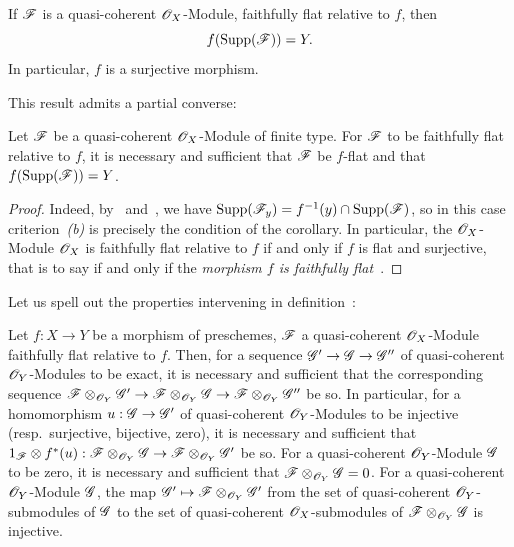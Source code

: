 \begin{corollary}[2.2.5]
\label{IV.2.2.5}
If $\mathscr{F}$ is a quasi-coherent $\mathscr{O}_X$-Module, faithfully flat relative to $f$, then
\[
  f(\operatorname{Supp}(\mathscr{F}))=Y.
\]
In particular, $f$ is a surjective morphism.
\end{corollary}

This result admits a partial converse:

\begin{corollary}[2.2.6]
\label{IV.2.2.6}
Let $\mathscr{F}$ be a quasi-coherent $\mathscr{O}_X$-Module of finite type. For $\mathscr{F}$ to be faithfully flat relative to $f$, it is necessary and sufficient that $\mathscr{F}$ be $f$-flat and that $f(\operatorname{Supp}(\mathscr{F}))=Y$.
\end{corollary}

\begin{proof}
Indeed, by~ and~, we have $\operatorname{Supp}(\mathscr{F}_y)=f^{-1}(y)\cap\operatorname{Supp}(\mathscr{F})$, so in this case criterion~\emph{(b)} is precisely the condition of the corollary.
In particular, the $\mathscr{O}_X$-Module $\mathscr{O}_X$ is faithfully flat relative to $f$ if and only if $f$ is flat and surjective, that is to say if and only if the \emph{morphism $f$ is faithfully flat}~.
\end{proof}

Let us spell out the properties intervening in definition~:

\begin{proposition}[2.2.7]
\label{IV.2.2.7}
Let $f:X\to Y$ be a morphism of preschemes, $\mathscr{F}$ a quasi-coherent $\mathscr{O}_X$-Module faithfully flat relative to $f$.
Then, for a sequence $\mathscr{G}'\to\mathscr{G}\to\mathscr{G}''$ of quasi-coherent $\mathscr{O}_Y$-Modules to be exact, it is necessary and sufficient that the corresponding sequence $\mathscr{F}\otimes_{\mathscr{O}_Y}\mathscr{G}'\to\mathscr{F}\otimes_{\mathscr{O}_Y}\mathscr{G}\to\mathscr{F}\otimes_{\mathscr{O}_Y}\mathscr{G}''$ be so.
In particular, for a homomorphism $u:\mathscr{G}\to\mathscr{G}'$ of quasi-coherent $\mathscr{O}_Y$-Modules to be injective \textnormal{(}resp.\ surjective, bijective, zero\textnormal{)}, it is necessary and sufficient that $1_{\mathscr{F}}\otimes f^*(u):\mathscr{F}\otimes_{\mathscr{O}_Y}\mathscr{G}\to\mathscr{F}\otimes_{\mathscr{O}_Y}\mathscr{G}'$ be so.
For a quasi-coherent $\mathscr{O}_Y$-Module $\mathscr{G}$ to be zero, it is necessary and sufficient that $\mathscr{F}\otimes_{\mathscr{O}_Y}\mathscr{G}=0$.
For a quasi-coherent $\mathscr{O}_Y$-Module $\mathscr{G}$, the map $\mathscr{G}'\mapsto\mathscr{F}\otimes_{\mathscr{O}_Y}\mathscr{G}'$ from the set of quasi-coherent $\mathscr{O}_Y$-submodules of $\mathscr{G}$ to the set of quasi-coherent $\mathscr{O}_X$-submodules of $\mathscr{F}\otimes_{\mathscr{O}_Y}\mathscr{G}$ is injective.
\end{proposition}

